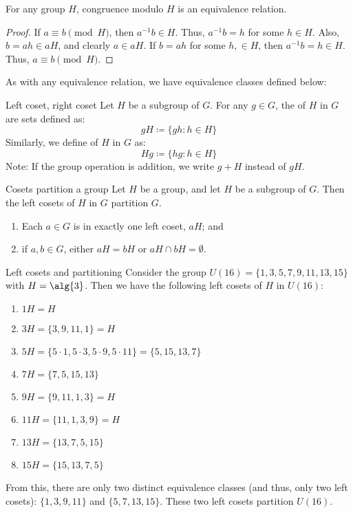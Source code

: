 \begin{thmbox}{}{}
    For any group $H$, congruence modulo $H$ is an equivalence relation.
    \tcblower
    \begin{proof}
        If $a \equiv b \pmod{H}$, then $a^{-1}b \in H$. Thus, $a^{-1}b = h$ for some $h \in H$. Also, $b = ah \in aH$, and clearly $a \in aH$. If $b = ah$ for some $h ,\in H$, then $a^{-1}b = h \in H$. Thus, $a \equiv b \pmod{H}$.
    \end{proof}
\end{thmbox}    

As with any equivalence relation, we have equivalence classes defined below:

\begin{dfnbox}{Left coset, right coset}{}
    Let $H$ be a subgroup of $G$. For any $g \in G$, the  of $H$ in $G$ are sets defined as:
    \[ gH \coloneq \{ gh : h \in H \} \]
    Similarly, we define  of $H$ in $G$ as:
    \[ Hg \coloneq \{ hg : h \in H \} \]
    Note: If the group operation is addition, we write $g + H$ instead of $gH$.
\end{dfnbox}

\begin{thmbox}{Cosets partition a group}{}
    Let $H$ be a group, and let $H$ be a subgroup of $G$. Then the left cosets of $H$ in $G$ partition $G$.
    \begin{enumerate}
        \item Each $a \in G$ is in exactly one left coset, $aH$; and
        \item if $a,b \in G$, either $aH = bH$ or $aH \cap bH = \emptyset$.
    \end{enumerate}
\end{thmbox}

\begin{exbox}{Left cosets and partitioning}{}
    Consider the group $U(16) = \{ 1,3,5,7,9,11,13,15 \}$ with $H = \alg{3}$. Then we have the following left cosets of $H$ in $U(16)$:
    \begin{enumerate}[noitemsep]
        \item $1H = H$
        \item $3H = \{3,9,11,1\} = H$
        \item $5H = \{ 5 \cdot 1, 5 \cdot 3, 5 \cdot 9, 5 \cdot 11 \} = \{5, 15, 13, 7\}$
        \item $7H = \{7, 5, 15, 13 \}$
        \item $9H = \{9, 11, 1, 3\} = H$
        \item $11H = \{ 11, 1, 3, 9 \} = H$
        \item $13H = \{ 13, 7, 5, 15 \}$
        \item $15H = \{ 15, 13, 7, 5 \}$
    \end{enumerate}
    From this, there are only two distinct equivalence classes (and thus, only two left cosets): $\{1,3,9,11\}$ and $\{5,7,13,15\}$. These two left cosets partition $U(16)$.
\end{exbox}

